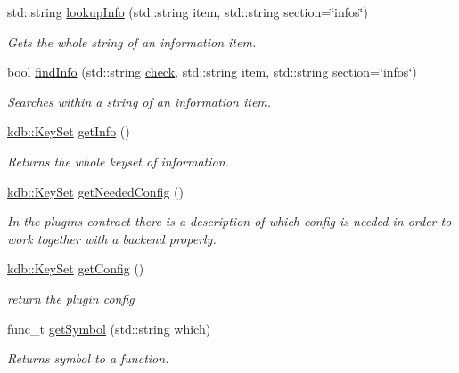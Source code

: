 \begin{DoxyCompactItemize}
std\+::string \hyperlink{classkdb_1_1tools_1_1Plugin_a5f1dc42adda8340f330eb902812e667d}{lookup\+Info} (std\+::string item, std\+::string section=\char`\"{}infos\char`\"{})
\begin{DoxyCompactList}\small\item\em Gets the whole string of an information item. \end{DoxyCompactList}\item 
bool \hyperlink{classkdb_1_1tools_1_1Plugin_a7911f8c46aea6fe4ec6fcb4788b77beb}{find\+Info} (std\+::string \hyperlink{classkdb_1_1tools_1_1Plugin_a5bb3db65b9d87d18787da8cc65eaca65}{check}, std\+::string item, std\+::string section=\char`\"{}infos\char`\"{})
\begin{DoxyCompactList}\small\item\em Searches within a string of an information item. \end{DoxyCompactList}\item 
\hyperlink{classkdb_1_1KeySet}{kdb\+::\+Key\+Set} \hyperlink{classkdb_1_1tools_1_1Plugin_aa4eac3b2b515104a0d595c717c546ec0}{get\+Info} ()
\begin{DoxyCompactList}\small\item\em Returns the whole keyset of information. \end{DoxyCompactList}\item 
\hyperlink{classkdb_1_1KeySet}{kdb\+::\+Key\+Set} \hyperlink{classkdb_1_1tools_1_1Plugin_ad2a0a4a64d17c479e7cd8b1402275cc7}{get\+Needed\+Config} ()
\begin{DoxyCompactList}\small\item\em In the plugin\textquotesingle{}s contract there is a description of which config is needed in order to work together with a backend properly. \end{DoxyCompactList}\item 
\hyperlink{classkdb_1_1KeySet}{kdb\+::\+Key\+Set} \hyperlink{classkdb_1_1tools_1_1Plugin_af3004444f5ef05dc8106646ff2b95694}{get\+Config} ()
\begin{DoxyCompactList}\small\item\em return the plugin config \end{DoxyCompactList}\item 
func\+\_\+t \hyperlink{classkdb_1_1tools_1_1Plugin_aca31140802ab463d5bddd95dee73194d}{get\+Symbol} (std\+::string which)
\begin{DoxyCompactList}\small\item\em Returns symbol to a function. \end{DoxyCompactList}\item 

\end{DoxyCompactItemize}
